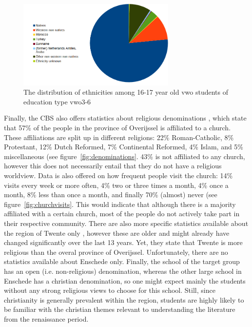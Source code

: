 \begin{figure}
    \centering
    \includegraphics[width=0.7\textwidth]{img/ethnicitychart.png}
    \caption{The distribution of ethnicities among 16-17 year old vwo students of education type vwo3-6 \protect\cite{cbsethn}}
    \label{fig:ethnicitychart}
\end{figure}

Finally, the CBS also offers statistics about religious denominations \cite{cbsdenom}, which state that 57\% of the people in the province of Overijssel is affiliated to a church. These affiliations are split up in different religions: 22\% Roman-Catholic, 8\% Protestant, 12\% Dutch Reformed, 7\% Continental Reformed, 4\% Islam, and 5\% miscellaneous (see figure~\ref{fig:denominations}. 43\% is not affiliated to any church, however this does not necessarily entail that they do not have a religious worldview. Data is also offered on how frequent people visit the church: 14\% visits every week or more often, 4\% two or three times a month, 4\% once a month, 8\% less than once a month, and finally 70\% (almost) never (see figure~\ref{fig:churchvisits}. This would indicate that although there is a majority affiliated with a certain church, most of the people do not actively take part in their respective community. There are also more specific statistics available about the region of Twente only \cite{cbsdenomold}, however these are older and might already have changed significantly over the last 13 years. Yet, they state that Twente is more religious than the overal province of Overijssel. Unfortunately, there are no statistics available about Enschede only. Finally, the school of the target group has an open (i.e. non-religious) denomination, whereas the other large school in Enschede has a christian denomination, so one might expect mainly the students without any strong religious views to choose for this school. Still, since christianity is generally prevalent within the region, students are highly likely to be familiar with the christian themes relevant to understanding the literature from the renaissance period.

